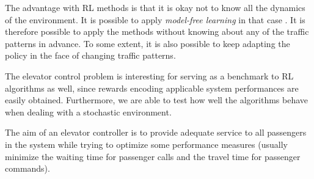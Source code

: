 The advantage with RL methods is that it is okay not to know all the dynamics of the environment. It is possible to apply \textit{model-free learning} in that case \cite{sutton_barto_2012}. It is therefore possible to apply the methods without knowing about any of the traffic patterns in advance. To some extent, it is also possible to keep adapting the policy in the face of changing traffic patterns.

The elevator control problem is interesting for serving as a benchmark to RL algorithms as well, since rewards encoding applicable system performances are easily obtained. Furthermore, we are able to test how well the algorithms behave when dealing with a stochastic environment.   








The aim of an elevator controller is to provide adequate service to all passengers in the system while trying to optimize some performance measures (usually
minimize the waiting time for passenger calls and the travel time for passenger
commands). 